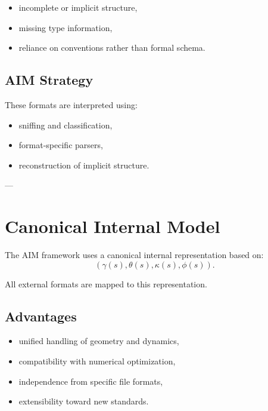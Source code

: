 \begin{itemize}
\item incomplete or implicit structure,
\item missing type information,
\item reliance on conventions rather than formal schema.
\end{itemize}

\subsection{AIM Strategy}

\begin{remark}
These formats are interpreted using:
\begin{itemize}
\item sniffing and classification,
\item format-specific parsers,
\item reconstruction of implicit structure.
\end{itemize}
\end{remark}

---

\section{Canonical Internal Model}

\begin{definition}
The AIM framework uses a canonical internal representation based on:
\[
(\gamma(s), \theta(s), \kappa(s), \phi(s)).
\]
\end{definition}

\begin{remark}
All external formats are mapped to this representation.
\end{remark}

\subsection{Advantages}

\begin{itemize}
\item unified handling of geometry and dynamics,
\item compatibility with numerical optimization,
\item independence from specific file formats,
\item extensibility toward new standards.
\end{itemize}

